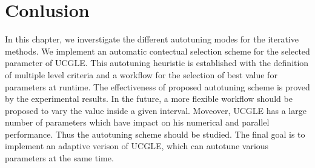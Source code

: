 \section{Conlusion}

In this chapter, we inverstigate the different autotuning modes for the iterative methods. We implement an automatic contectual selection scheme for the selected parameter of UCGLE. This autotuning heuristic is established with the definition of multiple level criteria and a workflow for the selection of best value for parameters at runtime. The effectiveness of proposed autotuning scheme is proved by the experimental results. In the future, a more flexible workflow should be proposed to vary the value inside a given interval. Moveover, UCGLE has a large number of parameters which have impact on his numerical and parallel performance. Thus the autotuning scheme should be studied. The final goal is to implement an adaptive verison of UCGLE, which can autotune various parameters at the same time.

\clearemptydoublepage